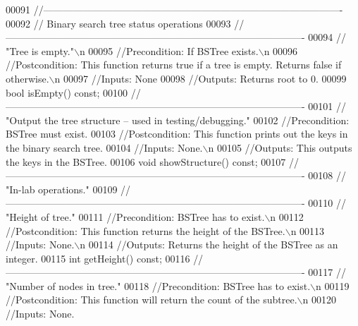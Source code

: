 \begin{DoxyCode}
00091     \textcolor{comment}{//-------------------------------------------------------------------------------------------}
00092     \textcolor{comment}{// Binary search tree status operations}
00093     \textcolor{comment}{//-------------------------------------------------------------------------------------------}
00094     \textcolor{comment}{// "Tree is empty."\(\backslash\)n}
00095     \textcolor{comment}{//Precondition: If BSTree exists.\(\backslash\)n}
00096     \textcolor{comment}{//Postcondition: This function returns true if a tree is empty. Returns false if otherwise.\(\backslash\)n}
00097     \textcolor{comment}{//Inputs: None}
00098     \textcolor{comment}{//Outputs: Returns root to 0.}
00099     \textcolor{keywordtype}{bool} isEmpty() \textcolor{keyword}{const};                        
00100     \textcolor{comment}{//-------------------------------------------------------------------------------------------}
00101     \textcolor{comment}{// "Output the tree structure -- used in testing/debugging."}
00102     \textcolor{comment}{//Precondition: BSTree must exist.}
00103     \textcolor{comment}{//Postcondition: This function prints out the keys in the binary search tree.}
00104     \textcolor{comment}{//Inputs: None.\(\backslash\)n}
00105     \textcolor{comment}{//Outputs: This outputs the keys in the BSTree.}
00106     \textcolor{keywordtype}{void} showStructure() \textcolor{keyword}{const};
00107     \textcolor{comment}{//-------------------------------------------------------------------------------------------}
00108     \textcolor{comment}{// "In-lab operations."}
00109     \textcolor{comment}{//-------------------------------------------------------------------------------------------}
00110     \textcolor{comment}{// "Height of tree."}
00111     \textcolor{comment}{//Precondition: BSTree has to exist.\(\backslash\)n}
00112     \textcolor{comment}{//Postcondition: This function returns the height of the BSTree.\(\backslash\)n}
00113     \textcolor{comment}{//Inputs: None.\(\backslash\)n}
00114     \textcolor{comment}{//Outputs: Returns the height of the BSTree as an integer.}
00115     \textcolor{keywordtype}{int} getHeight() \textcolor{keyword}{const};
00116     \textcolor{comment}{//-------------------------------------------------------------------------------------------}
00117     \textcolor{comment}{// "Number of nodes in tree."}
00118     \textcolor{comment}{//Precondition: BSTree has to exist.\(\backslash\)n}
00119     \textcolor{comment}{//Postcondition: This function will return the count of the subtree.\(\backslash\)n}
00120     \textcolor{comment}{//Inputs: None.}

\end{DoxyCode}
